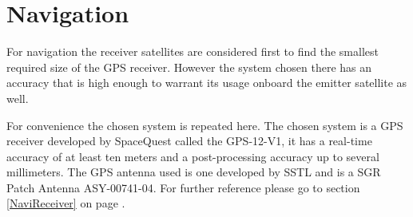 \section{Navigation}
\label{NaviEmitter}

For navigation the receiver satellites are considered first to find the smallest required size of the \acs{GPS} receiver. However the system chosen there has an accuracy that is high enough to warrant its usage onboard the emitter satellite as well.

For convenience the chosen system is repeated here. The chosen system is a \acs{GPS} receiver developed by SpaceQuest called the GPS-12-V1, it has a real-time accuracy of at least ten meters and a post-processing accuracy up to several millimeters. The \acs{GPS} antenna used is one developed by \ac{SSTL} and is a SGR Patch Antenna ASY-00741-04. For further reference please go to section \ref{NaviReceiver} on page \pageref{NaviReceiver}.